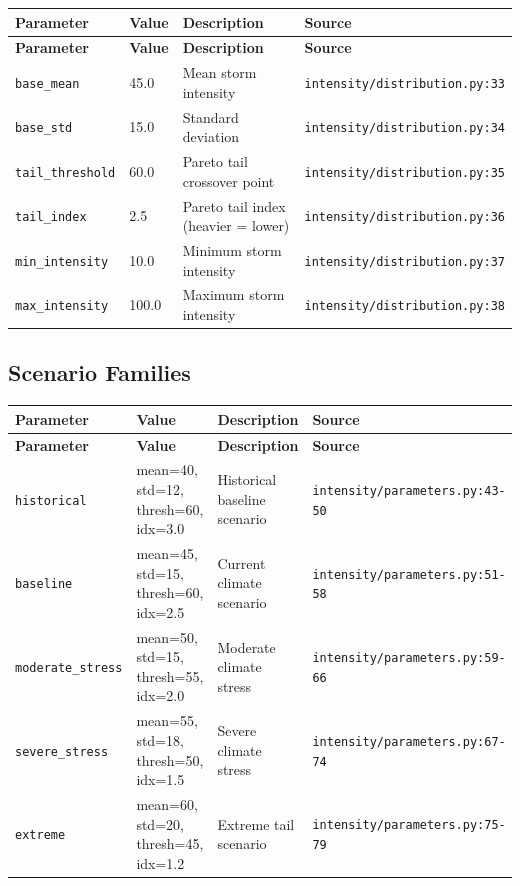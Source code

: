 \documentclass[11pt,a4paper]{article}
\begin{document}
\begin{longtable}{p{4cm}p{4cm}p{5.5cm}p{3.5cm}}
    \toprule
    \textbf{Parameter} & \textbf{Value} & \textbf{Description} & \textbf{Source} \\
    \midrule
    \endfirsthead
    \toprule
    \textbf{Parameter} & \textbf{Value} & \textbf{Description} & \textbf{Source} \\
    \midrule
    \endhead
    \bottomrule
    \endfoot
    \texttt{base\_mean} & 45.0 & Mean storm intensity & {\scriptsize \texttt{intensity/distribution.py:33}} \\
    \texttt{base\_std} & 15.0 & Standard deviation & {\scriptsize \texttt{intensity/distribution.py:34}} \\
    \texttt{tail\_threshold} & 60.0 & Pareto tail crossover point & {\scriptsize \texttt{intensity/distribution.py:35}} \\
    \texttt{tail\_index} & 2.5 & Pareto tail index (heavier = lower) & {\scriptsize \texttt{intensity/distribution.py:36}} \\
    \texttt{min\_intensity} & 10.0 & Minimum storm intensity & {\scriptsize \texttt{intensity/distribution.py:37}} \\
    \texttt{max\_intensity} & 100.0 & Maximum storm intensity & {\scriptsize \texttt{intensity/distribution.py:38}} \\
\end{longtable}

\subsection{Scenario Families}

\begin{longtable}{p{4cm}p{4cm}p{5.5cm}p{3.5cm}}
    \toprule
    \textbf{Parameter} & \textbf{Value} & \textbf{Description} & \textbf{Source} \\
    \midrule
    \endfirsthead
    \toprule
    \textbf{Parameter} & \textbf{Value} & \textbf{Description} & \textbf{Source} \\
    \midrule
    \endhead
    \bottomrule
    \endfoot
    \texttt{historical} & mean=40, std=12, thresh=60, idx=3.0 & Historical baseline scenario & {\scriptsize \texttt{intensity/parameters.py:43-50}} \\
    \texttt{baseline} & mean=45, std=15, thresh=60, idx=2.5 & Current climate scenario & {\scriptsize \texttt{intensity/parameters.py:51-58}} \\
    \texttt{moderate\_stress} & mean=50, std=15, thresh=55, idx=2.0 & Moderate climate stress & {\scriptsize \texttt{intensity/parameters.py:59-66}} \\
    \texttt{severe\_stress} & mean=55, std=18, thresh=50, idx=1.5 & Severe climate stress & {\scriptsize \texttt{intensity/parameters.py:67-74}} \\
    \texttt{extreme} & mean=60, std=20, thresh=45, idx=1.2 & Extreme tail scenario & {\scriptsize \texttt{intensity/parameters.py:75-79}} \\
\end{longtable}
\end{document}

